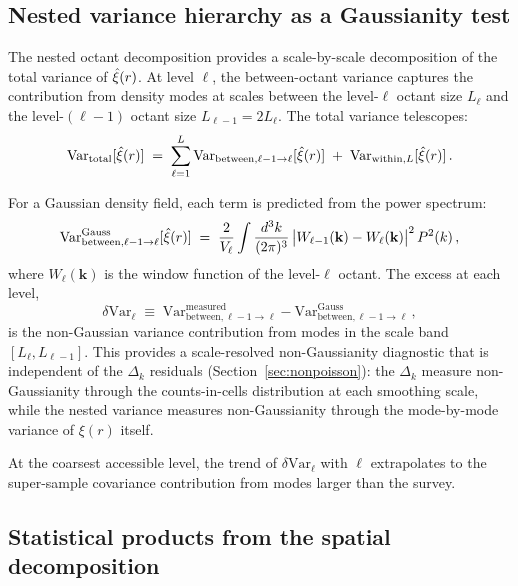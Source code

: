 \subsection{Nested variance hierarchy as a Gaussianity test}
\label{sec:nested_variance}

The nested octant decomposition provides a scale-by-scale decomposition of the total variance of $\hat{\xi}(r)$.  At level $\ell$, the between-octant variance captures the contribution from density modes at scales between the level-$\ell$ octant size $L_\ell$ and the level-$(\ell-1)$ octant size $L_{\ell-1} = 2L_\ell$.  The total variance telescopes:
\begin{equation}
  \mathrm{Var}_{\mathrm{total}}[\hat{\xi}(r)] \;=\; \sum_{\ell=1}^{L} \mathrm{Var}_{\mathrm{between},\ell-1\to\ell}[\hat{\xi}(r)] \;+\; \mathrm{Var}_{\mathrm{within},L}[\hat{\xi}(r)]\,.
  \label{eq:nested_variance}
\end{equation}

For a Gaussian density field, each term is predicted from the power spectrum:
\begin{equation}
  \mathrm{Var}_{\mathrm{between},\ell-1\to\ell}^{\mathrm{Gauss}}[\hat{\xi}(r)] \;=\; \frac{2}{V_\ell}\int\frac{d^3k}{(2\pi)^3}\,\bigl|W_{\ell-1}(\mathbf{k}) - W_\ell(\mathbf{k})\bigr|^2\,P^2(k)\,,
  \label{eq:gaussian_variance_band}
\end{equation}
where $W_\ell(\mathbf{k})$ is the window function of the level-$\ell$ octant.  The excess at each level,
\begin{equation}
  \delta\mathrm{Var}_\ell \;\equiv\; \mathrm{Var}_{\mathrm{between},\ell-1\to\ell}^{\mathrm{measured}} - \mathrm{Var}_{\mathrm{between},\ell-1\to\ell}^{\mathrm{Gauss}}\,,
  \label{eq:excess_variance_level}
\end{equation}
is the non-Gaussian variance contribution from modes in the scale band $[L_\ell, L_{\ell-1}]$.  This provides a scale-resolved non-Gaussianity diagnostic that is independent of the $\Delta_k$ residuals (Section~\ref{sec:nonpoisson}): the $\Delta_k$ measure non-Gaussianity through the counts-in-cells distribution at each smoothing scale, while the nested variance measures non-Gaussianity through the mode-by-mode variance of $\xi(r)$ itself.

At the coarsest accessible level, the trend of $\delta\mathrm{Var}_\ell$ with $\ell$ extrapolates to the super-sample covariance contribution from modes larger than the survey.

\subsection{Statistical products from the spatial decomposition}
\label{sec:density_diagnostics}

